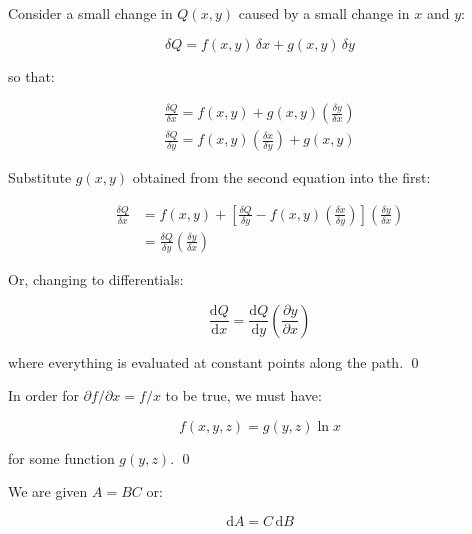 \documentclass[12pt]{article}
\begin{document}
Consider a small change in $Q(x, y)$ caused by a small change in $x$ and $y$:

\begin{equation}
    \delta Q = f(x, y) \, \delta x + g(x, y) \, \delta y
\end{equation}

so that:

\begin{equation}
\begin{split}
    \frac{\delta Q}{\delta x} = f(x, y) + g(x, y) \left( \frac{\delta y}{\delta x} \right) \\
    \frac{\delta Q}{\delta y} = f(x, y) \left( \frac{\delta x}{\delta y} \right) + g(x, y)
\end{split}
\end{equation}

Substitute $g(x, y)$ obtained from the second equation into the first:

\begin{equation}
\begin{split}
    \frac{\delta Q}{\delta x} &= f(x, y) + \left[ \frac{\delta Q}{\delta y} - f(x, y) \left( \frac{\delta x}{\delta y} \right) \right] \left( \frac{\delta y}{\delta x} \right) \\
    &= \frac{\delta Q}{\delta y} \left( \frac{\delta y}{\delta x} \right)
\end{split}
\end{equation}

Or, changing to differentials:

\begin{equation}
    \frac{\mathrm{d}Q}{\mathrm{d}x} = \frac{\mathrm{d}Q}{\mathrm{d}y} \left( \frac{\partial y}{\partial x} \right)
\end{equation}

where everything is evaluated at constant points along the path.
\qed


In order for $\partial f/\partial x = f/x$ to be true, we must have:

\begin{equation}
    f(x, y, z) = g(y, z) \ln{x}
\end{equation}

for some function $g(y, z)$.
\qed


We are given $A = BC$ or:

\begin{equation}
    \mathrm{d}A = C \, \mathrm{d}B
\end{equation}
\end{document}
